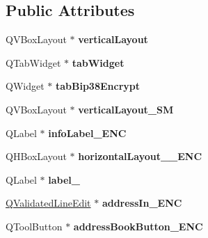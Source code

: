 \subsection*{Public Attributes}
\begin{DoxyCompactItemize}
\item 
\mbox{\label{class_ui___bip38_tool_dialog_abadcc3da510a025404ba2a683300b126}} 
Q\+V\+Box\+Layout $\ast$ {\bfseries vertical\+Layout}
\item 
\mbox{\label{class_ui___bip38_tool_dialog_a624b2f263275b364ad3334c5aacfb4ae}} 
Q\+Tab\+Widget $\ast$ {\bfseries tab\+Widget}
\item 
\mbox{\label{class_ui___bip38_tool_dialog_afef3ea682058453283bbd8104cc78cc0}} 
Q\+Widget $\ast$ {\bfseries tab\+Bip38\+Encrypt}
\item 
\mbox{\label{class_ui___bip38_tool_dialog_abb76ef70be663d8ad67cf7e71fe3d940}} 
Q\+V\+Box\+Layout $\ast$ {\bfseries vertical\+Layout\+\_\+\+SM}
\item 
\mbox{\label{class_ui___bip38_tool_dialog_a89255c9e73d53fd1b4c143566fa1b751}} 
Q\+Label $\ast$ {\bfseries info\+Label\+\_\+\+E\+NC}
\item 
\mbox{\label{class_ui___bip38_tool_dialog_a2bad686b40404bace8e97e7e33b86518}} 
Q\+H\+Box\+Layout $\ast$ {\bfseries horizontal\+Layout\+\_\+\_\+\+E\+NC}
\item 
\mbox{\label{class_ui___bip38_tool_dialog_a800d37079297cd66e45fdc1eff45cc1e}} 
Q\+Label $\ast$ {\bfseries label\+\_}
\item 
\mbox{\label{class_ui___bip38_tool_dialog_af868a197a20d8489426182d60431e6b6}} 
\mbox{\hyperlink{class_q_validated_line_edit}{Q\+Validated\+Line\+Edit}} $\ast$ {\bfseries address\+In\+\_\+\+E\+NC}
\item 
\mbox{\label{class_ui___bip38_tool_dialog_aad9e30f3a5d4a2d20849409ec698a733}} 
Q\+Tool\+Button $\ast$ {\bfseries address\+Book\+Button\+\_\+\+E\+NC}

\end{DoxyCompactItemize}

